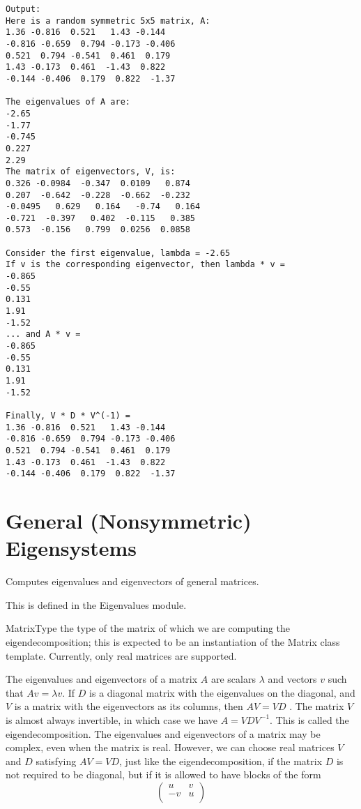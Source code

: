 \begin{verbatim}
Output:
Here is a random symmetric 5x5 matrix, A:
1.36 -0.816  0.521   1.43 -0.144
-0.816 -0.659  0.794 -0.173 -0.406
0.521  0.794 -0.541  0.461  0.179
1.43 -0.173  0.461  -1.43  0.822
-0.144 -0.406  0.179  0.822  -1.37

The eigenvalues of A are:
-2.65
-1.77
-0.745
0.227
2.29
The matrix of eigenvectors, V, is:
0.326 -0.0984  -0.347  0.0109   0.874
0.207  -0.642  -0.228  -0.662  -0.232
-0.0495   0.629   0.164   -0.74   0.164
-0.721  -0.397   0.402  -0.115   0.385
0.573  -0.156   0.799  0.0256  0.0858

Consider the first eigenvalue, lambda = -2.65
If v is the corresponding eigenvector, then lambda * v = 
-0.865
-0.55
0.131
1.91
-1.52
... and A * v = 
-0.865
-0.55
0.131
1.91
-1.52

Finally, V * D * V^(-1) = 
1.36 -0.816  0.521   1.43 -0.144
-0.816 -0.659  0.794 -0.173 -0.406
0.521  0.794 -0.541  0.461  0.179
1.43 -0.173  0.461  -1.43  0.822
-0.144 -0.406  0.179  0.822  -1.37
\end{verbatim}



\newpage
\section{General (Nonsymmetric) Eigensystems}
\label{Real General (Nonsymmetric) Eigensystem}

Computes eigenvalues and eigenvectors of general matrices. 

This is defined in the Eigenvalues module.

MatrixType the type of the matrix of which we are computing the eigendecomposition; this is expected to be an instantiation of the Matrix class template. Currently, only real matrices are supported. 

The eigenvalues and eigenvectors of a matrix $A$ are scalars $\lambda$ and vectors $v$ such that $A v = \lambda v$. If $D$ is a diagonal matrix with the eigenvalues on the diagonal, and $V$ is a matrix with the eigenvectors as its columns, then $A V = V D$ . The matrix $V$ is almost always invertible, in which case we have $A = V D V^{-1}$. This is called the eigendecomposition.
The eigenvalues and eigenvectors of a matrix may be complex, even when the matrix is real. However, we can choose real matrices $V$  and $D$  satisfying $A V = V D$, just like the eigendecomposition, if the matrix $D$ is not required to be diagonal, but if it is allowed to have blocks of the form 
\begin{equation} 
\begin{pmatrix}
u & v \\
-v & u \\
\end{pmatrix}
\end{equation} 

